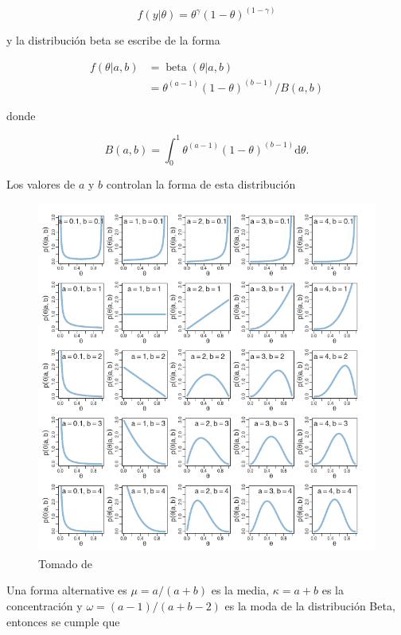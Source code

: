 \documentclass[
  12pt,
]{book}
\theoremstyle{definition}
\theoremstyle{definition}
\theoremstyle{definition}
\theoremstyle{remark}
\begin{document}
\begin{equation*}
    f(y | \theta)=\theta^{\gamma}(1-\theta)^{(1-\gamma)}
\end{equation*}

y la distribución beta se escribe de la forma

\begin{align*}
    f(\theta | a, b) & =\operatorname{beta}(\theta | a, b)         \\
                     & =\theta^{(a-1)}(1-\theta)^{(b-1)} / B(a, b)
\end{align*}

donde

\begin{equation*}
    B(a, b)=\int_{0}^{1}  \theta^{(a-1)}(1-\theta)^{(b-1)}\mathrm{d} \theta.
\end{equation*}

Los valores de \(a\) y \(b\) controlan la forma de esta distribución

\begin{figure}
\centering
\includegraphics{manual_figures/betas.png}
\caption{Tomado de \textcite{Kruschke2014}}
\end{figure}

Una forma alternative es \(\mu=a /(a+b)\) es la media, \(\kappa=a+b\)
es la concentración y \(\omega=(a-1) /(a+b-2)\) es la moda de la
distribución Beta, entonces se cumple que
\end{document}
